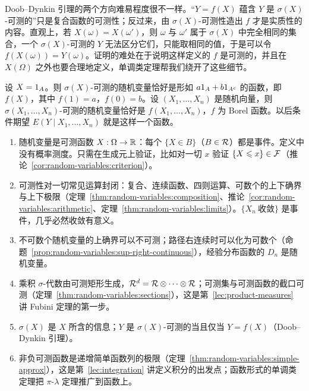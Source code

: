 \begin{remark}
Doob--Dynkin 引理的两个方向难易程度很不一样。“$Y=f(X)$ 蕴含 $Y$ 是 $\sigma(X)$-可测的”只是复合函数的可测性；反过来，由 $\sigma(X)$-可测性造出 $f$ 才是实质性的内容。直观上，若 $X(\omega)=X(\omega')$，则 $\omega$ 与 $\omega'$ 属于 $\sigma(X)$ 中完全相同的集合，一个 $\sigma(X)$-可测的 $Y$ 无法区分它们，只能取相同的值，于是可以令 $f(X(\omega))=Y(\omega)$。证明的难处在于说明这样定义的 $f$ 是可测的，并且在 $X(\Omega)$ 之外也要合理地定义，单调类定理帮我们绕开了这些细节。
\end{remark}

\begin{example}
设 $X=1_A$。则 $\sigma(X)$-可测的随机变量恰好是形如 $a1_A+b1_{A^c}$ 的函数，即 $f(X)$，其中 $f(1)=a$，$f(0)=b$。设 $(X_1,\dots,X_n)$ 是随机向量，则 $\sigma(X_1,\dots,X_n)$-可测的随机变量恰好是 $f(X_1,\dots,X_n)$，$f$ 为 Borel 函数。以后条件期望 $E(Y\mid X_1,\dots,X_n)$ 就是这样一个函数。
\end{example}


\begin{enumerate}
\item 随机变量是可测函数 $X:\Omega\to\mathbb{R}$：每个 $\{X\in B\}$（$B\in\mathcal{R}$）都是事件。定义中没有概率测度。只需在生成元上验证，比如对一切 $x$ 验证 $\{X\leqslant x\}\in\mathcal{F}$（推论~\ref{cor:random-variables:criterion}）。
\item 可测性对一切常见运算封闭：复合、连续函数、四则运算、可数个的上下确界与上下极限（定理~\ref{thm:random-variables:composition}、推论~\ref{cor:random-variables:arithmetic}、定理~\ref{thm:random-variables:limits}）。$\{X_n\ \text{收敛}\}$ 是事件，几乎必然收敛有意义。
\item 不可数个随机变量的上确界可以不可测；路径右连续时可以化为可数个（命题~\ref{prop:random-variables:sup-right-continuous}），经验分布函数的 $D_n$ 是随机变量。
\item 乘积 $\sigma$-代数由可测矩形生成，$\mathcal{R}^d=\mathcal{R}\otimes\cdots\otimes\mathcal{R}$；可测集与可测函数的截口可测（定理~\ref{thm:random-variables:sections}），这是第~\ref{lec:product-measures} 讲 Fubini 定理的第一步。
\item $\sigma(X)$ 是 $X$ 所含的信息；$Y$ 是 $\sigma(X)$-可测的当且仅当 $Y=f(X)$（Doob--Dynkin 引理）。
\item 非负可测函数是递增简单函数列的极限（定理~\ref{thm:random-variables:simple-approx}），这是第~\ref{lec:integration} 讲定义积分的出发点；函数形式的单调类定理把 $\pi$-$\lambda$ 定理推广到函数上。
\end{enumerate}

